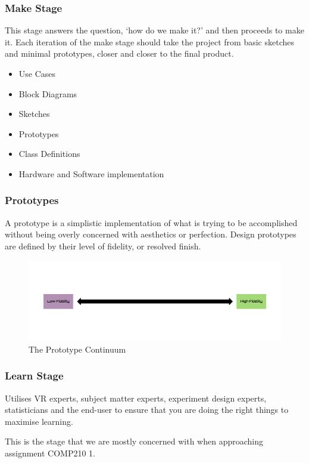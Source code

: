 \begin{frame}
	\frametitle{Make Stage}
	This stage answers the question, `how do we make it?' and then proceeds to make it. Each iteration of the make stage should take the project from basic sketches and minimal prototypes, closer and closer to the final product. 
	
\pause
	\begin{itemize}
		\item Use Cases
		\item Block Diagrams 
		\item Sketches				
		\item Prototypes
		\item Class Definitions
		\item Hardware and Software implementation   		
	\end{itemize}
\end{frame}

\begin{frame}
	\frametitle{Prototypes}
	A prototype is a simplistic implementation of what is trying to be accomplished without being overly concerned with aesthetics or perfection. Design prototypes are defined by their level of fidelity, or resolved finish. 
	\begin{figure}
		\includegraphics[scale=0.23]{assets/prototype.png}
		\caption{The Prototype Continuum}
	\end{figure}
\end{frame}


\begin{frame}
	\frametitle{Learn Stage}
	Utilises VR experts, subject matter experts, experiment design experts, statisticians and the end-user to ensure that you are doing the right things to maximise learning. 
	
	\vspace{.2in}
	This is the stage that we are mostly concerned with when approaching assignment COMP210 1.
\end{frame}



